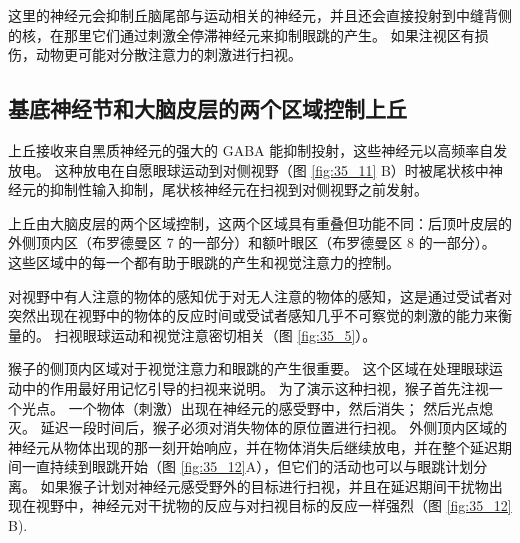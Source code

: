 这里的神经元会抑制丘脑尾部与运动相关的神经元，并且还会直接投射到中缝背侧的核，在那里它们通过刺激全停滞神经元来抑制眼跳的产生。 如果注视区有损伤，动物更可能对分散注意力的刺激进行扫视。

\subsection{基底神经节和大脑皮层的两个区域控制上丘}
上丘接收来自黑质神经元的强大的 GABA 能抑制投射，这些神经元以高频率自发放电。 这种放电在自愿眼球运动到对侧视野（图 \ref{fig:35_11} B）时被尾状核中神经元的抑制性输入抑制，尾状核神经元在扫视到对侧视野之前发射。

上丘由大脑皮层的两个区域控制，这两个区域具有重叠但功能不同：后顶叶皮层的外侧顶内区（布罗德曼区 7 的一部分）和额叶眼区（布罗德曼区 8 的一部分）。 这些区域中的每一个都有助于眼跳的产生和视觉注意力的控制。

对视野中有人注意的物体的感知优于对无人注意的物体的感知，这是通过受试者对突然出现在视野中的物体的反应时间或受试者感知几乎不可察觉的刺激的能力来衡量的。 扫视眼球运动和视觉注意密切相关（图 \ref{fig:35_5}）。

猴子的侧顶内区域对于视觉注意力和眼跳的产生很重要。 这个区域在处理眼球运动中的作用最好用记忆引导的扫视来说明。 为了演示这种扫视，猴子首先注视一个光点。 一个物体（刺激）出现在神经元的感受野中，然后消失； 然后光点熄灭。 延迟一段时间后，猴子必须对消失物体的原位置进行扫视。 
外侧顶内区域的神经元从物体出现的那一刻开始响应，并在物体消失后继续放电，并在整个延迟期间一直持续到眼跳开始（图 \ref{fig:35_12}A），但它们的活动也可以与眼跳计划分离。 
如果猴子计划对神经元感受野外的目标进行扫视，并且在延迟期间干扰物出现在视野中，神经元对干扰物的反应与对扫视目标的反应一样强烈（图 \ref{fig:35_12} B).

